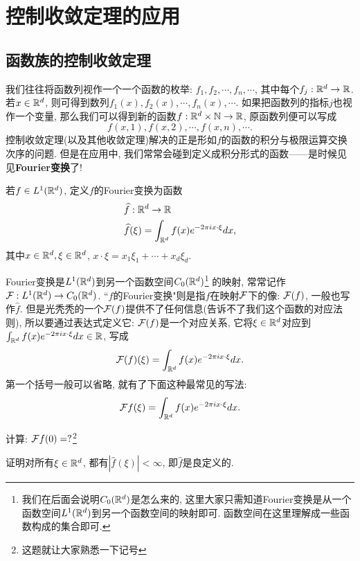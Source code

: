 \section{控制收敛定理的应用}\label{DCT}
\subsection{函数族的控制收敛定理}
我们往往将函数列视作一个一个函数的枚举: $f_1, f_2, \cdots, f_n, \cdots$, 其中每个$f_j: \mathbb{R}^d \to \mathbb{R}$. 若$x \in \mathbb{R}^d$, 则可得到数列$f_1(x), f_2(x), \cdots, f_n(x), \cdots$. 如果把函数列的指标$j$也视作一个变量, 那么我们可以得到新的函数$f: \mathbb{R}^d \times \mathbb{N} \to \mathbb{R}$, 原函数列便可以写成
$$f(x,1), f(x,2), \cdots, f(x,n), \cdots. $$
控制收敛定理(以及其他收敛定理)解决的正是形如$f$的函数的积分与极限运算交换次序的问题. 但是在应用中, 我们常常会碰到定义成积分形式的函数——是时候见见\textbf{Fourier变换}了!
\begin{definition}
    若$f \in L^1(\mathbb{R}^d)$, 定义$f$的Fourier变换为函数
    \begin{align*}
    &\widehat{f}: \mathbb{R}^d \to \mathbb{R} \\
    &\widehat{f}(\xi) = \int_{\mathbb{R}^d} f(x)e^{-2\pi ix \cdot \xi} dx,
    \end{align*}
    其中$x \in \mathbb{R}^d, \xi \in \mathbb{R}^d$, $x \cdot \xi = x_1\xi_1 + \cdots + x_d\xi_d$.
\end{definition}
\begin{remark}
    Fourier变换是$L^1(\mathbb{R}^d)$到另一个函数空间$C_0(\mathbb{R}^d)$\footnote{我们在后面会说明$C_0(\mathbb{R}^d)$是怎么来的, 这里大家只需知道Fourier变换是从一个函数空间$L^1(\mathbb{R}^d)$到另一个函数空间的映射即可. 函数空间在这里理解成一些函数构成的集合即可. }
    的映射, 常常记作$\mathcal{F}: L^1(\mathbb{R}^d) \to C_0(\mathbb{R}^d)$. ``$f$的Fourier变换"则是指$f$在映射$\mathcal{F}$下的像: $\mathcal{F}(f)$, 一般也写作$\hat{f}$. 但是光秃秃的一个$\mathcal{F}(f)$提供不了任何信息(告诉不了我们这个函数的对应法则), 所以要通过表达式定义它: $\mathcal{F}(f)$是一个对应关系, 它将$\xi \in \mathbb{R}^d$对应到
    $\int_{\mathbb{R}^d} f(x)e^{-2\pi ix \cdot \xi} dx \in \mathbb{R}$, 写成
    $$\mathcal{F}(f)(\xi) = \int_{\mathbb{R}^d} f(x)e^{-2\pi ix \cdot \xi} dx.$$ 第一个括号一般可以省略, 就有了下面这种最常见的写法:
    $$\mathcal{F} f(\xi) = \int_{\mathbb{R}^d} f(x)e^{-2\pi ix \cdot \xi} dx.$$
\end{remark}
\begin{exercise}
    计算: $\mathcal{F} f(0)=?$\footnote{这题就让大家熟悉一下记号}
\end{exercise}
\begin{exercise}
    证明对所有$\xi \in \mathbb{R}^d$, 都有$|\hat{f}(\xi)|<\infty$, 即$\hat{f}$是良定义的.
\end{exercise}
